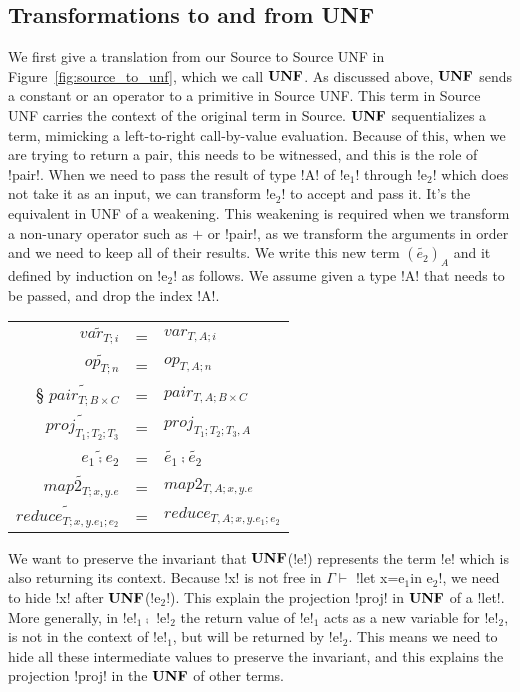 

\subsection{Transformations to and from UNF} %
\label{sub:transformations to and from UNF}

We first give a translation from our Source to Source UNF in Figure~\ref{fig:source_to_unf}, which we call $\mathbf{UNF}$.
As discussed above, $\mathbf{UNF}$ sends a constant or an operator to a primitive in Source UNF. 
This term in Source UNF carries the context of the original term in Source.
$\mathbf{UNF}$ sequentializes a term, mimicking a left-to-right call-by-value evaluation.
Because of this, when we are trying to return a pair, this needs to be witnessed, and this is the role of !pair!.
When we need to pass the result of type !A! of !e$_{1}$! through !e$_{2}$! which does not take it as an input, we can transform !e$_{2}$! to accept and pass it.
It's the equivalent in UNF of a weakening.
This weakening is required when we transform a non-unary operator such as $+$ or !pair!, as we transform the arguments in order and we need to keep all of their results.
We write this new term $(\widetilde{e_{2}})_{A}$ and it defined by induction on !e$_{2}$! as follows. 
We assume given a type !A! that needs to be passed, and drop the index !A!.

\begin{tabular}{r c l}
    $\widetilde{var_{T;i}}$  &=& $var_{T,A;i}$ \\
    $\widetilde{op_{T;n}}$  &=& $op_{T,A;n}$ \\§
    $\widetilde{pair_{T;B\times C}}$  &=& $pair_{T,A;B\times C}$ \\
    $\widetilde{proj_{T_1;T_2;T_3}}$  &=& $proj_{T_1;T_2;T_3,A}$ \\
    $\widetilde{e_1 \comp e_2}$  &=& $\widetilde{e_1}\comp\widetilde{e_2}$ \\
    $\widetilde{map2_{T;x,y.e}}$  &=& $map2_{T,A;x,y.e}$ \\
    $\widetilde{reduce_{T;x,y.e_1;e_2}}$ &=& $reduce_{T,A;x,y.e_1;e_2}$ \\
\end{tabular}

We want to preserve the invariant that $\mathbf{UNF}$(!e!) represents the term !e! which is also returning its context. 
Because !x! is not free in $\Gamma \vdash$ !let x=e$_1$in e$_2$!, we need to hide !x! after $\mathbf{UNF}$(!e$_2$!).
This explain the projection !proj! in $\mathbf{UNF}$ of a !let!. 
More generally, in !e!$_{1} \comp$ !e!$_{2}$ the return value of !e!$_{1}$ acts as a new variable for !e!$_{2}$, 
is not in the context of !e!$_{1}$, but will be returned by !e!$_{2}$.
This means we need to hide all these intermediate values to preserve the invariant,
and this explains the projection !proj! in the $\mathbf{UNF}$ of other terms. 

